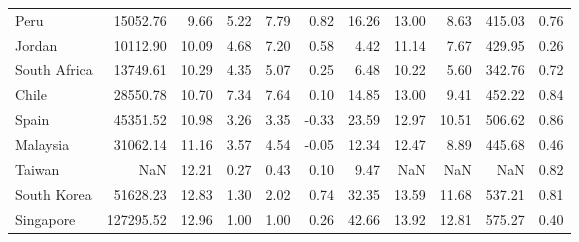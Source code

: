 \begin{table}
\begin{tabular}{lrrrrrrrrrr}
Peru & 15052.76 & 9.66 & 5.22 & 7.79 & 0.82 & 16.26 & 13.00 & 8.63 & 415.03 & 0.76 \\
Jordan & 10112.90 & 10.09 & 4.68 & 7.20 & 0.58 & 4.42 & 11.14 & 7.67 & 429.95 & 0.26 \\
South Africa & 13749.61 & 10.29 & 4.35 & 5.07 & 0.25 & 6.48 & 10.22 & 5.60 & 342.76 & 0.72 \\
Chile & 28550.78 & 10.70 & 7.34 & 7.64 & 0.10 & 14.85 & 13.00 & 9.41 & 452.22 & 0.84 \\
Spain & 45351.52 & 10.98 & 3.26 & 3.35 & -0.33 & 23.59 & 12.97 & 10.51 & 506.62 & 0.86 \\
Malaysia & 31062.14 & 11.16 & 3.57 & 4.54 & -0.05 & 12.34 & 12.47 & 8.89 & 445.68 & 0.46 \\
Taiwan & NaN & 12.21 & 0.27 & 0.43 & 0.10 & 9.47 & NaN & NaN & NaN & 0.82 \\
South Korea & 51628.23 & 12.83 & 1.30 & 2.02 & 0.74 & 32.35 & 13.59 & 11.68 & 537.21 & 0.81 \\
Singapore & 127295.52 & 12.96 & 1.00 & 1.00 & 0.26 & 42.66 & 13.92 & 12.81 & 575.27 & 0.40 \\
\bottomrule
\end{tabular}
\end{table}
